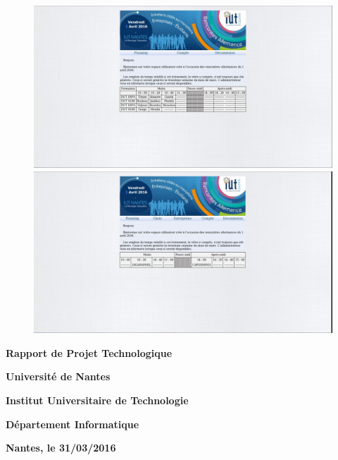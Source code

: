 \documentclass[12pt,a4paper]{article}
\begin{document}
\begin{figure}
  \centering
  \includegraphics[scale=0.4]{figure14(3_2).jpg}
  \includegraphics[scale=0.4]{figure15(3_2).jpg}
\end{figure}

\newpage
\begin{center}\begin{huge}\textbf{Rapport de Projet Technologique}\end{huge}


\vfill

\begin{LARGE}\textbf{Université de Nantes}\end{LARGE}
\bigbreak
\begin{LARGE}\textbf{Institut Universitaire de Technologie}\end{LARGE}
\bigbreak
\begin{LARGE}\textbf{Département Informatique}\end{LARGE}


\vfill

\begin{LARGE}\textbf{Nantes, le 31/03/2016}\end{LARGE}
\end{center}
\end{document}
